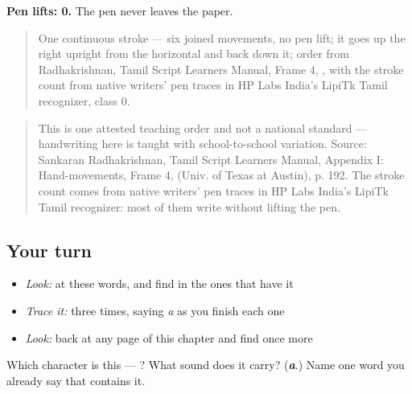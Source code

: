 \textbf{Pen lifts: 0.} The pen never leaves the paper.

\begin{quote}
One continuous stroke — six joined movements, no pen lift; it goes up the right upright from the horizontal and back down it; order from Radhakrishnan, Tamil Script Learners Manual, Frame 4, , with the stroke count from native writers' pen traces in HP Labs India's LipiTk Tamil recognizer, class 0.
\end{quote}

\begin{quote}
This is one attested teaching order and not a national standard — handwriting here is taught with school-to-school variation. Source: Sankaran Radhakrishnan, Tamil Script Learners Manual, Appendix I: Hand-movements, Frame 4,  (Univ. of Texas at Austin), p. 192. The stroke count comes from native writers' pen traces in HP Labs India's LipiTk Tamil recognizer: most of them write  without lifting the pen.
\end{quote}

\subsection*{Your turn}
\begin{itemize}
\raggedright
  \item \emph{Look:} at these words, and find  in the ones that have it
\end{itemize}

\begin{quote}
\end{quote}

\begin{itemize}
\raggedright
  \item \emph{Trace it:}  three times, saying \emph{a} as you finish each one
  \item \emph{Look:} back at any page of this chapter and find  once more
\end{itemize}

\begin{tcolorbox}[breakable,colback=teal!4,colframe=teal!35!black,title={Before you move on}]
Which character is this — ? What sound does it carry? (\emph{\textbf{a}}.) Name one word you already say that contains it.
\end{tcolorbox}

